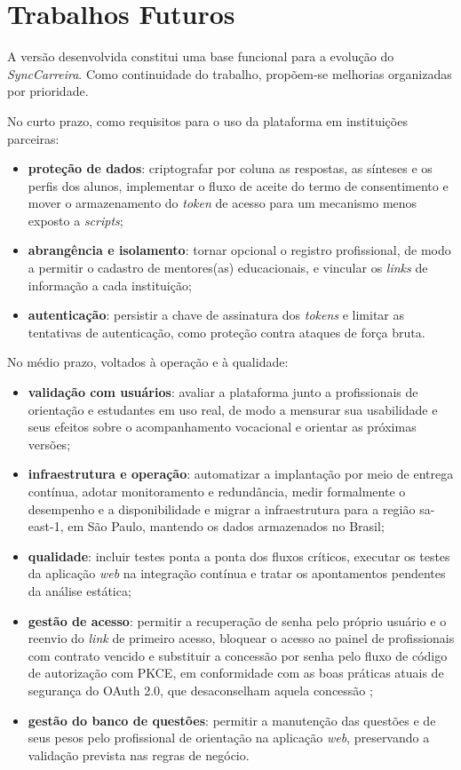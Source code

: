 \section{Trabalhos Futuros}

A versão desenvolvida constitui uma base funcional para a evolução do \textit{SyncCarreira}. Como continuidade do trabalho, propõem-se melhorias organizadas por prioridade.

No curto prazo, como requisitos para o uso da plataforma em instituições parceiras:

\begin{itemize}
  \item \textbf{proteção de dados}: criptografar por coluna as respostas, as sínteses e os perfis dos alunos, implementar o fluxo de aceite do termo de consentimento e mover o armazenamento do \textit{token} de acesso para um mecanismo menos exposto a \textit{scripts};
  \item \textbf{abrangência e isolamento}: tornar opcional o registro profissional, de modo a permitir o cadastro de mentores(as) educacionais, e vincular os \textit{links} de informação a cada instituição;
  \item \textbf{autenticação}: persistir a chave de assinatura dos \textit{tokens} e limitar as tentativas de autenticação, como proteção contra ataques de força bruta.
\end{itemize}

No médio prazo, voltados à operação e à qualidade:

\begin{itemize}
  \item \textbf{validação com usuários}: avaliar a plataforma junto a profissionais de orientação e estudantes em uso real, de modo a mensurar sua usabilidade e seus efeitos sobre o acompanhamento vocacional e orientar as próximas versões;
  \item \textbf{infraestrutura e operação}: automatizar a implantação por meio de entrega contínua, adotar monitoramento e redundância, medir formalmente o desempenho e a disponibilidade e migrar a infraestrutura para a região sa-east-1, em São Paulo, mantendo os dados armazenados no Brasil;
  \item \textbf{qualidade}: incluir testes ponta a ponta dos fluxos críticos, executar os testes da aplicação \textit{web} na integração contínua e tratar os apontamentos pendentes da análise estática;
  \item \textbf{gestão de acesso}: permitir a recuperação de senha pelo próprio usuário e o reenvio do \textit{link} de primeiro acesso, bloquear o acesso ao painel de profissionais com contrato vencido e substituir a concessão por senha pelo fluxo de código de autorização com PKCE, em conformidade com as boas práticas atuais de segurança do OAuth 2.0, que desaconselham aquela concessão \cite{lodderstedt2025rfc9700};
  \item \textbf{gestão do banco de questões}: permitir a manutenção das questões e de seus pesos pelo profissional de orientação na aplicação \textit{web}, preservando a validação prevista nas regras de negócio.
\end{itemize}

